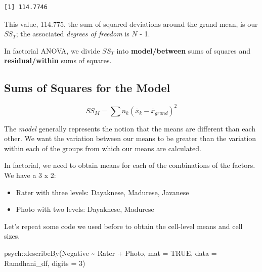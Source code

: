 \documentclass[
  11pt,
]{book}
\newenvironment{Shaded}{\begin{snugshade}}{\end{snugshade}}
\newcommand{\AttributeTok}[1]{\textcolor[rgb]{0.77,0.63,0.00}{#1}}
\newcommand{\ConstantTok}[1]{\textcolor[rgb]{0.00,0.00,0.00}{#1}}
\newcommand{\DecValTok}[1]{\textcolor[rgb]{0.00,0.00,0.81}{#1}}
\newcommand{\FunctionTok}[1]{\textcolor[rgb]{0.00,0.00,0.00}{#1}}
\newcommand{\NormalTok}[1]{#1}
\newcommand{\SpecialCharTok}[1]{\textcolor[rgb]{0.00,0.00,0.00}{#1}}
\providecommand{\tightlist}{%
  \setlength{\itemsep}{0pt}\setlength{\parskip}{0pt}}
\begin{document}
\begin{verbatim}
[1] 114.7746
\end{verbatim}

This value, 114.775, the sum of squared deviations around the grand mean, is our \(SS_T\); the associated \emph{degrees of freedom} is \(N\) - 1.

In factorial ANOVA, we divide \(SS_T\) into \textbf{model/between} sums of squares and \textbf{residual/within} sums of squares.

\hypertarget{sums-of-squares-for-the-model}{%
\subsection{Sums of Squares for the Model}\label{sums-of-squares-for-the-model}}

\[SS_{M}= \sum n_{k}(\bar{x}_{k}-\bar{x}_{grand})^{2}\]

The \emph{model} generally represents the notion that the means are different than each other. We want the variation between our means to be greater than the variation within each of the groups from which our means are calculated.

In factorial, we need to obtain means for each of the combinations of the factors. We have a 3 x 2:

\begin{itemize}
\tightlist
\item
  Rater with three levels: Dayaknese, Madurese, Javanese
\item
  Photo with two levels: Dayaknese, Madurese
\end{itemize}

Let's repeat some code we used before to obtain the cell-level means and cell sizes.

\begin{Shaded}
\begin{Highlighting}[]
\NormalTok{psych}\SpecialCharTok{::}\FunctionTok{describeBy}\NormalTok{(Negative }\SpecialCharTok{\textasciitilde{}}\NormalTok{ Rater }\SpecialCharTok{+}\NormalTok{ Photo, }\AttributeTok{mat =} \ConstantTok{TRUE}\NormalTok{, }\AttributeTok{data =}\NormalTok{ Ramdhani\_df,}
    \AttributeTok{digits =} \DecValTok{3}\NormalTok{)}
\end{Highlighting}
\end{Shaded}
\end{document}
